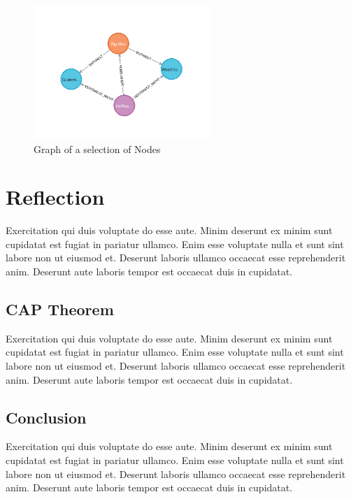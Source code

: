 \begin{figure}[H]
    \centering
    \caption{Graph of a selection of Nodes} \label{fig:neo4jGraph_2}
    \includegraphics[width=0.6\textwidth]{images/neo4j_example_graph_2.png}
\end{figure}

\section{Reflection} \label{sec:reflectionNeo4j}

Exercitation qui duis voluptate do esse aute. Minim deserunt ex minim sunt cupidatat est fugiat in pariatur ullamco. Enim esse voluptate nulla et sunt sint labore non ut eiusmod et. Deserunt laboris ullamco occaecat esse reprehenderit anim. Deserunt aute laboris tempor est occaecat duis in cupidatat.

\subsection{CAP Theorem} \label{subsec:capTheoremNeo4j}

Exercitation qui duis voluptate do esse aute. Minim deserunt ex minim sunt cupidatat est fugiat in pariatur ullamco. Enim esse voluptate nulla et sunt sint labore non ut eiusmod et. Deserunt laboris ullamco occaecat esse reprehenderit anim. Deserunt aute laboris tempor est occaecat duis in cupidatat.

\subsection{Conclusion} \label{subsec:conclusionNeo4j}

Exercitation qui duis voluptate do esse aute. Minim deserunt ex minim sunt cupidatat est fugiat in pariatur ullamco. Enim esse voluptate nulla et sunt sint labore non ut eiusmod et. Deserunt laboris ullamco occaecat esse reprehenderit anim. Deserunt aute laboris tempor est occaecat duis in cupidatat.
